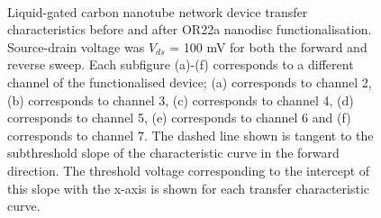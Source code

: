 \documentclass[
  a4paper,
]{scrbook}
\begin{document}
\begin{figure}
\begin{minipage}[t]{0.45\linewidth}
{{}

}

\end{minipage}%
%
\begin{minipage}[t]{0.01\linewidth}

{\centering 

~

}

\end{minipage}%

\caption[Carbon nanotube network device transfer characteristics before
and after unsuccessful OR22a nanodisc
functionalisation.]{\label{fig-OR22a-variability-TX}Liquid-gated carbon
nanotube network device transfer characteristics before and after OR22a
nanodisc functionalisation. Source-drain voltage was \(V_{ds}\) = 100 mV
for both the forward and reverse sweep. Each subfigure (a)-(f)
corresponds to a different channel of the functionalised device; (a)
corresponds to channel 2, (b) corresponds to channel 3, (c) corresponds
to channel 4, (d) corresponds to channel 5, (e) corresponds to channel 6
and (f) corresponds to channel 7. The dashed line shown is tangent to
the subthreshold slope of the characteristic curve in the forward
direction. The threshold voltage corresponding to the intercept of this
slope with the x-axis is shown for each transfer characteristic curve.}

\end{figure}
\end{document}
